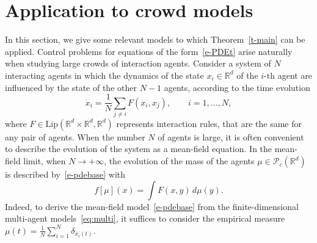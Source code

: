 \documentclass{article}
\newcommand{\R}{\mathbb{R}}
\renewcommand{\P}{\mathcal{P}_c(\R^d)}
\theoremstyle{definition}\newtheorem{remark}{Remark}
\newcommand{\Lip}{\mathrm{Lip}}
\begin{document}
\section{Application to crowd models}\label{sec:mas}
In this section, we give some relevant models to which Theorem~\ref{t-main} can be applied. 
Control problems for equations of the form~\eqref{e-PDEt} arise naturally when studying large crowds of interaction agents. 
Consider a system of $N$ interacting agents in which the dynamics of the state $x_i \in \R^d$ of the $i$-th agent are influenced by the state of the other $N-1$ agents, according to the time evolution
\begin{equation}\label{eq:multi}
 \dot x_i  = \frac{1}{N} \sum_{j\neq i } F(x_i,x_j), \qquad  i=1,\ldots,N,
\end{equation}
where $F\in \Lip(\R^d \times \R^d,\R^d)$ represents interaction rules, that are the same for any pair of agents.
When the number $N$ of agents is large, it is often convenient to describe the evolution of the system as a mean-field equation. 
In the mean-field limit, when $N \to +\infty$, the evolution of the mass of the agents $\mu \in \P$ is described by~\eqref{e-pdebase} with
\begin{equation}\label{eq:fmu}
f[\mu](x) = \int F(x,y) \, d\mu(y).
 \end{equation}
Indeed, to derive the mean-field model~\eqref{e-pdebase} from the finite-dimensional multi-agent models~\eqref{eq:multi}, it suffices to consider the empirical measure $\mu(t) = \frac{1}{N}\sum_{i=1}^N \delta_{x_i(t)}$.%
\end{document}

